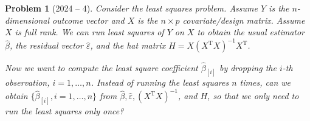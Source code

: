 \documentclass[12pt]{amsart}
\newtheorem{problem}{Problem}
\begin{document}
\begin{problem}[2024 -- 4]
Consider the least squares problem. Assume $Y$ is the $n$-dimensional outcome vector and $X$ is the $n \times p$ covariate/design matrix. Assume $X$ is full rank. We can run least squares of $Y$ on $X$ to obtain the usual estimator $\hat{\beta}$, the residual vector $\hat{\varepsilon}$, and the hat matrix $H=X(X^{\mathrm{T}} X)^{-1} X^{\mathrm{T}}$.

Now we want to compute the least square coefficient $\hat{\beta}_{[i]}$ by dropping the $i$-th observation, $i=1, \ldots, n$. Instead of running the least squares $n$ times, can we obtain $\{\hat{\beta}_{[i]}, i=1, \ldots, n\}$ from $\hat{\beta}, \hat{\varepsilon},(X^{\mathrm{T}} X)^{-1}$, and $H$, so that we only need to run the least squares only once?
\end{problem}
\end{document}
